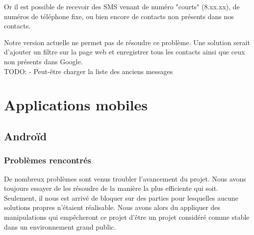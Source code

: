 Or il est possible de recevoir des SMS venant de numéro "courts" (8.xx.xx), de numéros de téléphone fixe, ou bien encore de contacts non présents dans nos contacts.

Notre version actuelle ne permet pas de résoudre ce problème.
Une solution serait d'ajouter un filtre sur la page web et enregistrer tous les contacts ainsi que ceux non présents dans Google.
\\




TODO:
- Peut-être charger la liste des anciens messages
\\






\section{Applications mobiles}


\subsection{Androïd}


\subsubsection{Problèmes rencontrés}

De nombreux problèmes sont venus troubler l'avancement du projet. Nous avons toujours essayer de les
résoudre de la manière la plus efficiente qui soit. Seulement, il nous est arrivé de bloquer sur des
parties pour lesquelles aucune solutions propres n'étaient réalisable. Nous avons alors du appliquer 
des manipulations qui empêcheront ce projet d'être un projet considéré comme stable dans un environnement
grand public.


